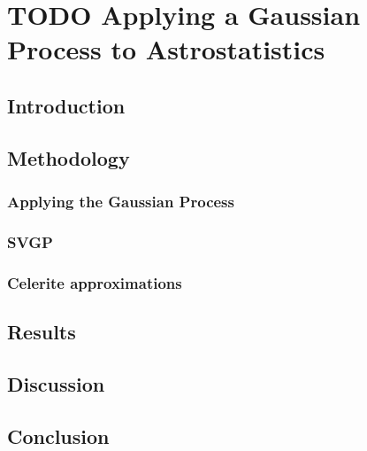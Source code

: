 \section{TODO Applying a Gaussian Process to Astrostatistics}
% 
% 
% 
% 
% 
% 
% 
% 


\subsection{Introduction}


\subsection{Methodology}


\subsubsection{Applying the Gaussian Process}

\subsubsection{SVGP}

\subsubsection{Celerite approximations}

\subsection{Results}

\subsection{Discussion}


\subsection{Conclusion}
